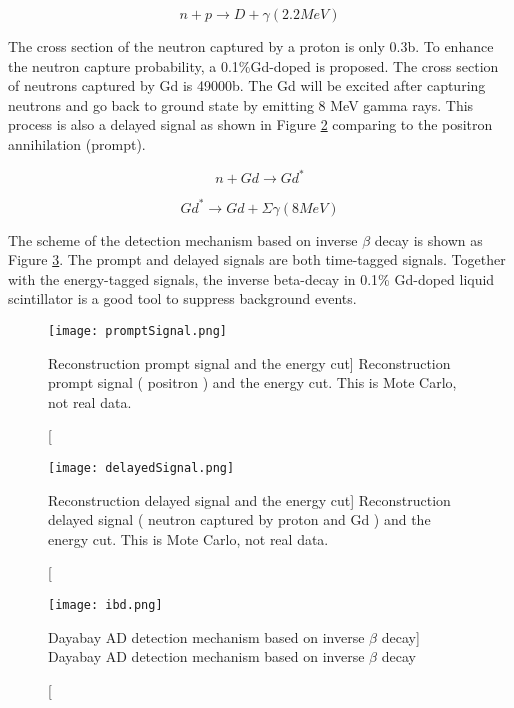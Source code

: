 \begin{equation}
n + p \rightarrow D + \gamma (2.2 MeV)
\label{NeutronPCapture}
\end{equation}


The cross section of the neutron captured by a proton is only 0.3b.
To enhance the neutron capture probability, a 0.1\%Gd-doped
is proposed. The cross section of neutrons captured by Gd is 49000b. The Gd will be excited
after capturing neutrons and go back to ground state by emitting 8 MeV gamma rays. This
process is also a delayed signal as shown in Figure \ref{fig:delayedSignal} comparing to the positron annihilation (prompt).


\begin{equation}
n + Gd \rightarrow Gd^*
\label{NeutronGdCapture}
\end{equation}


\begin{equation}
Gd^* \rightarrow Gd + \Sigma \gamma (8 MeV)
\label{GdStarToGd}
\end{equation}


The scheme of the detection mechanism based on inverse $\beta$ decay is shown as Figure \ref{fig:ibd}.
The prompt and delayed signals are both time-tagged signals.
Together with the energy-tagged signals, the inverse beta-decay
in 0.1\% Gd-doped liquid scintillator is a good tool to suppress
background events.


\begin{figure}
    \label{fig:promptSignal}
    \centering
    \texttt{[image: promptSignal.png]}
    \caption
    [Reconstruction prompt signal and the energy cut]
    {Reconstruction prompt signal ( positron ) and the energy cut. This is Mote Carlo, not real data.}
    \end{figure}

\begin{figure}
    \label{fig:delayedSignal}
    \centering
    \texttt{[image: delayedSignal.png]}
    \caption
    [Reconstruction delayed signal and the energy cut]
    {Reconstruction delayed signal ( neutron captured by proton and Gd ) and the energy cut. This is Mote Carlo, not real data.}
    \end{figure}



\begin{figure}
    \label{fig:ibd}
    \centering
    \texttt{[image: ibd.png]}
    \caption
    [Dayabay AD detection mechanism based on inverse $\beta$ decay]
    {Dayabay AD detection mechanism based on inverse $\beta$ decay}
    \end{figure}


